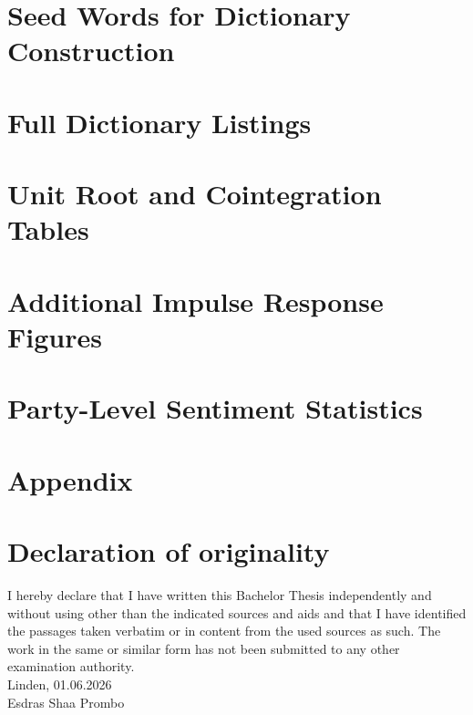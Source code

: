 \documentclass[12pt]{scrartcl}
\numberwithin{equation}{section}				%
\begin{document}
    \section{Seed Words for Dictionary Construction}
    
    \section{Full Dictionary Listings}
    
    \section{Unit Root and Cointegration Tables}
    
    \section{Additional Impulse Response Figures}
    
    \section{Party-Level Sentiment Statistics}
	
	
	\clearpage
	
	\section*{Appendix}
	
	
	
	\clearpage
	\printbibliography
	
	
	\clearpage
	\section*{Declaration of originality}
	\thispagestyle{empty}
	I hereby declare that I have written this Bachelor Thesis independently and without using other than the indicated sources and aids and that I have identified the passages taken verbatim or in content from the used sources as such. The work in the same or similar form has not been submitted to any other examination authority.
	\\[1cm]
	Linden, 01.06.2026
	\\[1.5cm]
	Esdras Shaa Prombo
	
\end{document}
